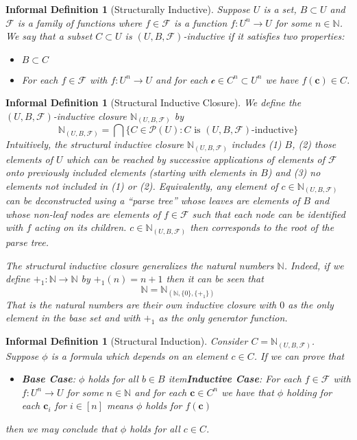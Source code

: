 \documentclass[12pt]{article}
\theoremstyle{break}
\theoremstyle{break}
\theoremstyle{break}
\theoremstyle{break}
\theoremstyle{break}
\newtheorem{informal definition}[definition]{Informal Definition}
\theoremstyle{break}
\newtheorem{informal theorem}[theorem]{Informal Theorem}
\newcommand{\bv}[1]{\boldsymbol{#1}}
\newcommand{\mc}[1]{\mathcal{#1}}
\newcommand{\qq}[1]{``#1''}
\newcommand{\natnum}[0]{\mathbb{N}}
\newcommand{\UBF}[0]{(U, B, \mc{F})}
\newcommand{\NUBF}[0]{\natnum_{\UBF}}
\begin{document}
\begin{informal definition}[Structurally Inductive]
Suppose $U$ is a set, $B\subset U$ and $\mc{F}$ is a family of functions where $f\in \mc{F}$ is a function $f:U^n \to U$ for some $n\in \natnum$.
We say that a subset $C\subset U$ is $\UBF$-inductive if it satisfies two properties:
\begin{itemize}
\item{$B\subset C$}
\item{For each $f\in \mc{F}$ with $f:U^n \to U$ and for each $\mc{c} \in C^n \subset U^n$ we have $f(\bv{c}) \in C$.}
\end{itemize}
\end{informal definition}

\begin{informal definition}[Structural Inductive Closure]
We define the $\UBF$-inductive closure $\NUBF$ by
$$
\NUBF = \bigcap \{C \in \mc{P}(U): C \text{ is } \UBF\text{-inductive}\}
$$
Intuitively, the structural inductive closure $\NUBF$ includes (1) $B$, (2) those elements of $U$ which can be reached by successive applications of elements of $\mc{F}$ onto previously included elements (starting with elements in $B$) and (3) no elements not included in (1) or (2).
Equivalently, any element of $c\in \NUBF$ can be deconstructed using a \qq{parse tree} whose leaves are elements of $B$ and whose non-leaf nodes are elements of $f\in \mc{F}$ such that each node can be identified with $f$ acting on its children.
$c\in \NUBF$ then corresponds to the root of the parse tree.

The structural inductive closure generalizes the natural numbers $\natnum$.
Indeed, if we define $+_1: \natnum \to \natnum$ by $+_1(n) = n+1$ then it can be seen that
$$
\natnum = \natnum_{(\natnum, \{0\}, \{+_1\})}
$$
That is the natural numbers are their own inductive closure with $0$ as the only element in the base set and with $+_1$ as the only generator function.
\end{informal definition}

\begin{informal definition}[Structural Induction]
Consider $C = \NUBF$.
Suppose $\phi$ is a formula which depends on an element $c\in C$.
If we can prove that
\begin{itemize}
\item{\textbf{Base Case}: $\phi$ holds for all $b\in B$}
item{\textbf{Inductive Case}: For each $f\in \mc{F}$ with $f:U^n \to U$ for some $n\in \natnum$ and for each $\bv{c} \in C^n$ we have that $\phi$ holding for each $\bv{c}_i$ for $i\in [n]$ means $\phi$ holds for $f(\bv{c})$}
\end{itemize}
then we may conclude that $\phi$ holds for all $c\in C$.
\end{informal definition}
\end{document}
